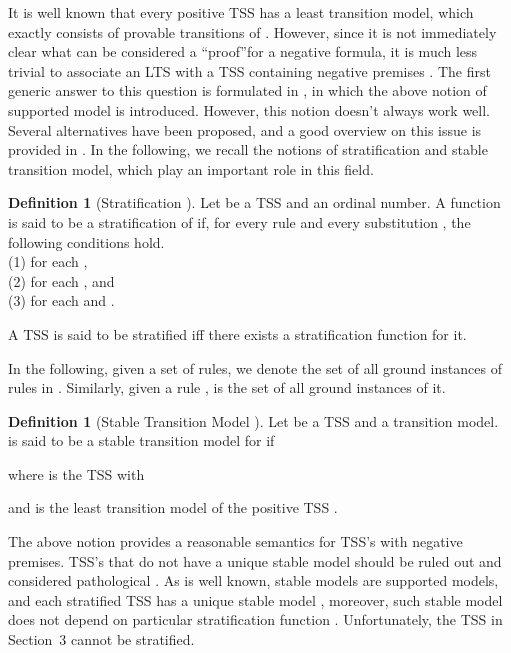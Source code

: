 \documentclass{elsarticle}
\theoremstyle{plain}
\theoremstyle{definition}
\newtheorem{mydefn}[theorem]{Definition}
\begin{document}
It is well known that every positive TSS  has a least transition model, which exactly consists of provable transitions of  \cite{Bol96}.
However, since it is not immediately clear what can be considered a \textquotedblleft proof\textquotedblright for a negative formula, it is much less trivial to associate an LTS with a TSS containing negative premises \cite{Groote93}.
The first generic answer to this question is formulated in \cite{Bloom95,Groote93}, in which the above notion of supported model is introduced.
However, this notion doesn't always work well. Several alternatives have been proposed, and a good overview on this issue is provided in \cite{Glabbeek04}.
In the following, we recall the notions of stratification and stable transition model, which play an important role in this field.

\begin{mydefn}[Stratification \cite{Aceto01,Bol96}]\label{D:STRATIFICATION}
     Let  be a TSS and  an ordinal number. A function  is said to be a stratification of  if, for every rule  and every substitution , the following conditions hold.\\
    (1)  for each ,\\
    (2)  for each , and\\
    (3)  for each  and .

    A TSS is said to be stratified iff there exists a stratification function for it.
\end{mydefn}

In the following, given a set  of rules, we denote  the set of all ground instances of rules in . Similarly, given a rule ,  is the set of all ground instances of it.

\begin{mydefn}[Stable Transition Model  \cite{Bol96,Gelfond88}]\label{D:STABLE}
    Let  be a TSS and  a transition model.  is said to be a stable transition model for  if
    
    where
     is the TSS  with
    
    and  is the least transition model of the positive TSS .
\end{mydefn}

The above notion provides a reasonable semantics for TSS's with negative premises.
TSS's that do not have a unique stable model should be ruled out and considered pathological \cite{Bol96}.
As is well known, stable models are supported models, and each stratified TSS  has a unique stable model \cite{Bol96}, moreover, such stable model does not depend on particular stratification function \cite{Groote93}. Unfortunately, the TSS  in Section~3 cannot be stratified.
\end{document}
